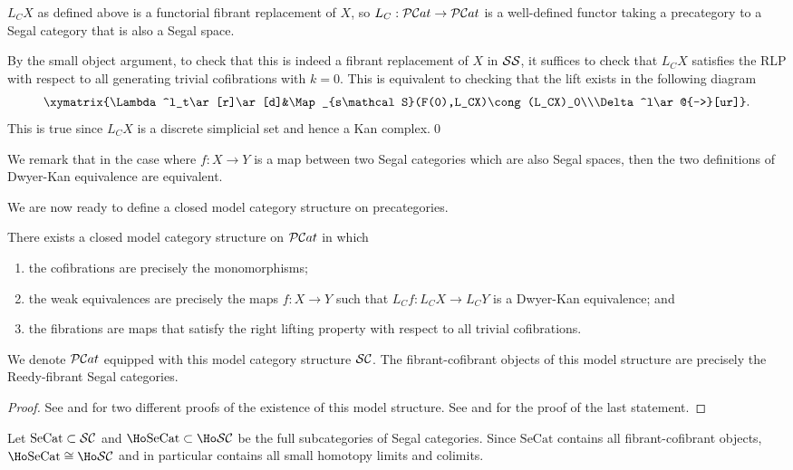 \begin{prop}
$L_CX$ as defined above is a functorial fibrant replacement of $X$, so $L_C:{\cal PC}at\to{\cal PC}at$ is a well-defined functor taking a precategory to a Segal category that is also a Segal space.
\end{prop}

By the small object argument, to check that this is indeed a fibrant replacement of $X$ in ${\cal SS}$, it suffices to check that $L_CX$ satisfies the RLP with respect to all generating trivial cofibrations with $k=0$. This is equivalent to checking that the lift exists in the following diagram
$$\xymatrix{\Lambda^l_t\ar[r]\ar[d]&\Map_{s\mathcal S}(F(0),L_CX)\cong (L_CX)_0\\\Delta^l\ar@{-->}[ur]}.$$
This is true since $L_CX$ is a discrete simplicial set and hence a Kan complex.\qed

We remark that in the case where $f:X\to Y$ is a map between two Segal categories which are also Segal spaces, then the two definitions of Dwyer-Kan equivalence are equivalent.

We are now ready to define a closed model category structure on precategories.

\begin{thm}
There exists a closed model category structure on ${\cal PC}at$ in which
\begin{enumerate}
\item the cofibrations are precisely the monomorphisms;
\item the weak equivalences are precisely the maps $f:X\to Y$ such that $L_Cf:L_CX\to L_CY$ is a Dwyer-Kan equivalence; and
\item the fibrations are maps that satisfy the right lifting property with respect to all trivial cofibrations.
\end{enumerate}
We denote ${\cal PC}at$ equipped with this model category structure ${\cal SC}$. The fibrant-cofibrant objects of this model structure are precisely the Reedy-fibrant Segal categories.
\end{thm}
\begin{proof}
See \cite[Thm 2.3]{hs} and \cite[Thm 5.1]{bergner2} for two different proofs of the existence of this model structure. See \cite[Cor 5.13]{bergner2} and \cite[Thm 3.2]{bergner3} for the proof of the last statement.
\end{proof}

Let $\mathrm{SeCat}\subset{\cal SC}$ and $\Ho\mathrm{SeCat}\subset\Ho\cal{SC}$ be the full subcategories of Segal categories. Since $\mathrm{SeCat}$ contains all fibrant-cofibrant objects, $\Ho\mathrm{SeCat}\cong\Ho\cal{SC}$ and in particular contains all small homotopy limits and colimits.

